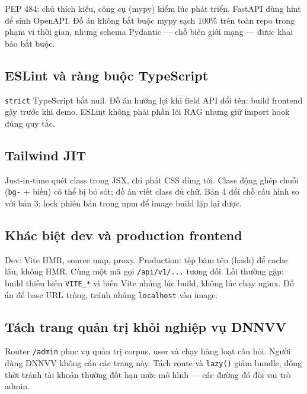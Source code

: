 PEP 484: chú thích kiểu, công cụ (mypy) kiểm lúc phát triển. FastAPI dùng hint
để sinh OpenAPI. Đồ án không bắt buộc mypy sạch 100\% trên toàn repo trong phạm
vi thời gian, nhưng schema Pydantic --- chỗ biên giới mạng --- được khai báo
bắt buộc.

\subsection{ESLint và ràng buộc TypeScript}

\texttt{strict} TypeScript bắt null. Đồ án hưởng lợi khi field API đổi tên: build
frontend gãy trước khi demo. ESLint không phải phần lõi RAG nhưng giữ import
hook đúng quy tắc.

\subsection{Tailwind JIT}

Just-in-time quét class trong JSX, chỉ phát CSS dùng tới. Class động ghép chuỗi
(\texttt{bg-} + biến) có thể bị bỏ sót; đồ án viết class đủ chữ. Bản 4 đổi chỗ
cấu hình so với bản 3; lock phiên bản trong npm để image build lặp lại được.

\subsection{Khác biệt dev và production frontend}

Dev: Vite HMR, source map, proxy. Production: tệp băm tên (hash) để cache lâu,
không HMR. Cùng một mã gọi \texttt{/api/v1/...} tương đối. Lỗi thường gặp: build
thiếu biến \texttt{VITE\_*} vì biến Vite nhúng lúc build, không lúc chạy nginx.
Đồ án để base URL trống, tránh nhúng \texttt{localhost} vào image.

\subsection{Tách trang quản trị khỏi nghiệp vụ DNNVV}

Router \texttt{/admin} phục vụ quản trị corpus, user và chạy hàng loạt câu hỏi.
Người dùng DNNVV không cần các trang này. Tách route và \texttt{lazy()} giảm
bundle, đồng thời tránh tài khoản thường đốt hạn mức mô hình --- các đường đó
đòi vai trò admin.
